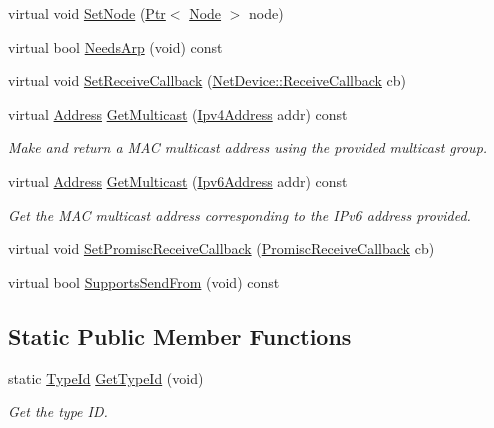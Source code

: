\begin{DoxyCompactItemize}
\item 
virtual void \hyperlink{classns3_1_1NonCommunicatingNetDevice_a0d984a1f3435e52dde0db7cde331db05}{Set\+Node} (\hyperlink{classns3_1_1Ptr}{Ptr}$<$ \hyperlink{classns3_1_1Node}{Node} $>$ node)
\item 
virtual bool \hyperlink{classns3_1_1NonCommunicatingNetDevice_a7bdd336411018b8e7d73470c4644fa2c}{Needs\+Arp} (void) const 
\item 
virtual void \hyperlink{classns3_1_1NonCommunicatingNetDevice_a61db434524934cba5db88b272fb3b53f}{Set\+Receive\+Callback} (\hyperlink{classns3_1_1NetDevice_ad5e5e1ca187472bc2ba99575d8def568}{Net\+Device\+::\+Receive\+Callback} cb)
\item 
virtual \hyperlink{classns3_1_1Address}{Address} \hyperlink{classns3_1_1NonCommunicatingNetDevice_a138bb76c5980fcd4c846f72342c32c93}{Get\+Multicast} (\hyperlink{classns3_1_1Ipv4Address}{Ipv4\+Address} addr) const 
\begin{DoxyCompactList}\small\item\em Make and return a M\+AC multicast address using the provided multicast group. \end{DoxyCompactList}\item 
virtual \hyperlink{classns3_1_1Address}{Address} \hyperlink{classns3_1_1NonCommunicatingNetDevice_adafb215c0e61dd4cf8ae69521503a98d}{Get\+Multicast} (\hyperlink{classns3_1_1Ipv6Address}{Ipv6\+Address} addr) const 
\begin{DoxyCompactList}\small\item\em Get the M\+AC multicast address corresponding to the I\+Pv6 address provided. \end{DoxyCompactList}\item 
virtual void \hyperlink{classns3_1_1NonCommunicatingNetDevice_abc5ba4a76b2b73167fa9702c4b2a5a08}{Set\+Promisc\+Receive\+Callback} (\hyperlink{classns3_1_1NetDevice_a427225795919f26c414bee2ea3f31ed2}{Promisc\+Receive\+Callback} cb)
\item 
virtual bool \hyperlink{classns3_1_1NonCommunicatingNetDevice_a0a9878583879e8e06307ca490adff4f0}{Supports\+Send\+From} (void) const 
\end{DoxyCompactItemize}
\subsection*{Static Public Member Functions}
\begin{DoxyCompactItemize}
\item 
static \hyperlink{classns3_1_1TypeId}{Type\+Id} \hyperlink{classns3_1_1NonCommunicatingNetDevice_af468a4a4203f354734c8520fd501bfea}{Get\+Type\+Id} (void)
\begin{DoxyCompactList}\small\item\em Get the type ID. \end{DoxyCompactList}\end{DoxyCompactItemize}
